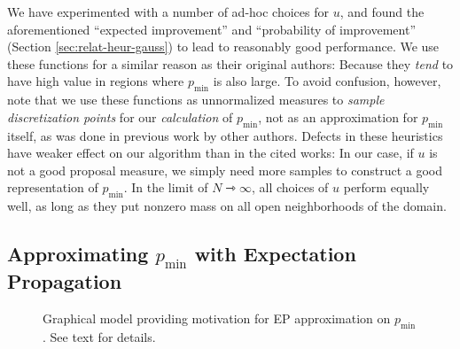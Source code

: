 \documentclass[twoside,11pt]{article}
\newcommand{\N}{\mathcal{N}}
\newcommand{\pmin}{p_{\min}}
\renewcommand{\vec}{\boldsymbol}
\renewcommand{\to}{\rightarrowtriangle}
\begin{document}
We have experimented with a number of ad-hoc choices for $u$, and
found the aforementioned ``expected improvement'' and ``probability of
improvement'' (Section \ref{sec:relat-heur-gauss}) to lead to
reasonably good performance. We use these functions for a similar
reason as their original authors: Because they \emph{tend} to have
high value in regions where $\pmin$ is also large. To avoid confusion,
however, note that we use these functions as unnormalized measures to
\emph{sample discretization points} for our \emph{calculation} of
$\pmin$, not as an approximation for $\pmin$ itself, as was done in
previous work by other authors. Defects in these heuristics have
weaker effect on our algorithm than in the cited works: In our case,
if $u$ is not a good proposal measure, we simply need more samples to
construct a good representation of $\pmin$. In the limit of
$N\to\infty$, all choices of $u$ perform equally well, as long as they
put nonzero mass on all open neighborhoods of the domain.

\subsection{Approximating $\pmin$ with Expectation Propagation}
\label{sec:appr-pmin-with}
\begin{figure}
  \centering
  \caption{Graphical model providing motivation for EP approximation
    on $\pmin$. See text for details.}
  \label{fig:EP}
\end{figure}
\end{document}
